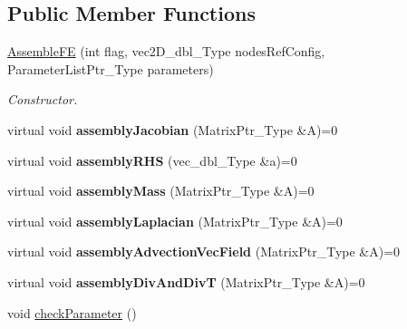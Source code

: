 \subsection*{Public Member Functions}
\begin{DoxyCompactItemize}
\item 
\hyperlink{classFEDD_1_1AssembleFE_a01b82579a8bb5060009bda0c69fbf891}{Assemble\+FE} (int flag, vec2\+D\+\_\+dbl\+\_\+\+Type nodes\+Ref\+Config, Parameter\+List\+Ptr\+\_\+\+Type parameters)
\begin{DoxyCompactList}\small\item\em Constructor. \end{DoxyCompactList}\item 
\mbox{\label{classFEDD_1_1AssembleFE_a15ac1de174d10a48d571f24bfd23cdac}} 
virtual void {\bfseries assembly\+Jacobian} (Matrix\+Ptr\+\_\+\+Type \&A)=0
\item 
\mbox{\label{classFEDD_1_1AssembleFE_a6d20abafb34994bc72049f728db5fad5}} 
virtual void {\bfseries assembly\+R\+HS} (vec\+\_\+dbl\+\_\+\+Type \&a)=0
\item 
\mbox{\label{classFEDD_1_1AssembleFE_a6d441674490b1d2ebbeb91877aea217d}} 
virtual void {\bfseries assembly\+Mass} (Matrix\+Ptr\+\_\+\+Type \&A)=0
\item 
\mbox{\label{classFEDD_1_1AssembleFE_a0de34d679938540ca4f3b79dfeb40432}} 
virtual void {\bfseries assembly\+Laplacian} (Matrix\+Ptr\+\_\+\+Type \&A)=0
\item 
\mbox{\label{classFEDD_1_1AssembleFE_aea2e78f1c7aee3ca21def4685d47c986}} 
virtual void {\bfseries assembly\+Advection\+Vec\+Field} (Matrix\+Ptr\+\_\+\+Type \&A)=0
\item 
\mbox{\label{classFEDD_1_1AssembleFE_a10f8615fde79627d5c1327903cb88059}} 
virtual void {\bfseries assembly\+Div\+And\+DivT} (Matrix\+Ptr\+\_\+\+Type \&A)=0
\item 
\mbox{\label{classFEDD_1_1AssembleFE_a54942b2e3e8e0aaf321a893f209e3309}} 
void \hyperlink{classFEDD_1_1AssembleFE_a54942b2e3e8e0aaf321a893f209e3309}{check\+Parameter} ()

\end{DoxyCompactItemize}
